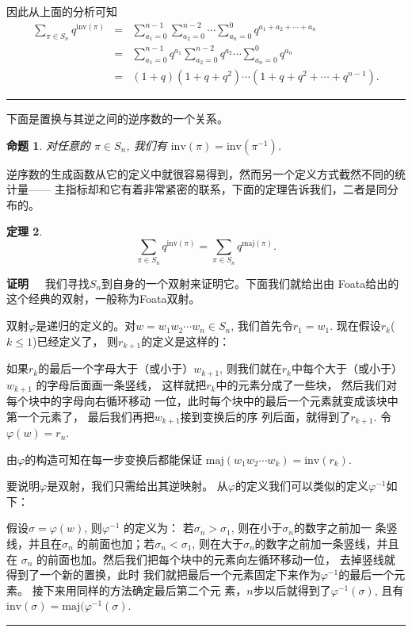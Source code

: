 \documentclass[a4paper,11pt]{article}
\newtheorem{thm}{定理}[section]
\newtheorem{prop}[thm]{命题}
\def\qed{\nopagebreak\hfill{\rule{4pt}{7pt}}\medbreak}
\def\pf{{\bf 证明~~ }}
\def \sg{\sigma}
\def \maj{\mathrm{maj}}
\def \inv{\mathrm{inv}}
\begin{document}
因此从上面的分析可知
\begin{eqnarray*}
	\sum_{\pi\in S_n}q^{\inv(\pi)}
	&=&\sum_{a_1=0}^{n-1}\sum_{a_2=0}^{n-2}\cdots
	\sum_{a_n=0}^{0}q^{a_1+a_2+\cdots+a_n}\\
	&=& \sum_{a_1=0}^{n-1}q^{a_1}\sum_{a_2=0}^{n-2}q^{a_2} \cdots
	\sum_{a_n=0}^{0}q^{a_n}\\
	&=&(1+q)(1+q+q^2)\cdots(1+q+q^2+\cdots+q^{n-1}).
\end{eqnarray*}
\qed

下面是置换与其逆之间的逆序数的一个关系。
\begin{prop}
	对任意的 $\pi \in S_n$, 我们有 $\inv(\pi)=\inv(\pi^{-1})$.
\end{prop}

逆序数的生成函数从它的定义中就很容易得到，然而另一个定义方式截然不同的统计量——
主指标却和它有着非常紧密的联系，下面的定理告诉我们，二者是同分布的。

\begin{thm}
	\begin{equation}
	\sum_{\pi\in S_n}q^{\inv(\pi)}=\sum_{\pi\in S_n}q^{\maj(\pi)}.
	\end{equation}
\end{thm}

\pf
我们寻找$S_n$到自身的一个双射来证明它。下面我们就给出由
Foata给出的这个经典的双射，一般称为Foata双射。

双射$\varphi$是递归的定义的。对$w=w_1w_2\cdots w_n \in S_n$,
我们首先令$r_1=w_1$. 现在假设$r_k$($k\leq 1$)已经定义了，
则$r_{k+1}$的定义是这样的：

如果$r_k$的最后一个字母大于（或小于）$w_{k+1}$,
则我们就在$r_k$中每个大于（或小于）$w_{k+1}$ 的字母后面画一条竖线，
这样就把$r_k$中的元素分成了一些块，
然后我们对每个块中的字母向右循环移动
一位，此时每个块中的最后一个元素就变成该块中第一个元素了，
最后我们再把$w_{k+1}$接到变换后的序
列后面，就得到了$r_{k+1}$. 令$\varphi(w)=r_n$.

由$\varphi$的构造可知在每一步变换后都能保证
$\maj(w_1w_2\cdots w_k)=\inv(r_k)$.　

要说明$\varphi$是双射，我们只需给出其逆映射。
从$\varphi$的定义我们可以类似的定义$\varphi^{-1}$如下：

假设$\sigma=\varphi(w)$, 则$\varphi^{-1}$ 的定义为：
若$\sg_n>\sg_1$, 则在小于$\sg_n$的数字之前加一 条竖线，并且在$\sg_n$
的前面也加；若$\sg_n<\sg_1$,
则在大于$\sg_n$的数字之前加一条竖线，并且在 $\sg_n$
的前面也加。然后我们把每个块中的元素向左循环移动一位，
去掉竖线就得到了一个新的置换，此时
我们就把最后一个元素固定下来作为$\varphi^{-1}$的最后一个元素。
接下来用同样的方法确定最后第二个元
素，$n$步以后就得到了$\varphi^{-1}(\sg)$,
且有$\inv(\sg)=\maj(\varphi^{-1}(\sg)$. \qed
\end{document}

